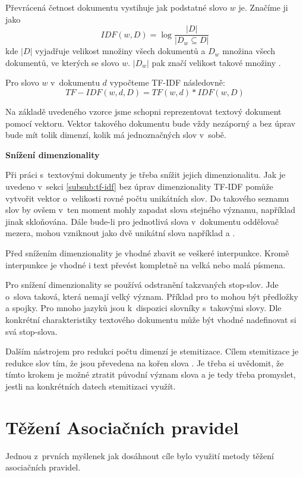 \documentclass[thesis=M,czech]{FITthesis}[2012/10/20]
\begin{document}
\begin{itemize}
			Převrácená četnost dokumentu vystihuje jak podstatné slovo $w$ je. Značíme ji jako $$IDF(w,D) = \log{\frac{|D|}{|D_w \subseteq D|}}$$ kde $|D|$ vyjadřuje velikost množiny všech dokumentů a $D_w$ množina všech dokumentů, ve kterých se slovo $w$. $|D_w|$ pak značí velikost takové množiny \cite{RamosTF-IDF}.
			
			Pro slovo $w$ v~dokumentu $d$ vypočteme TF-IDF následovně:
			$$TF-IDF(w,d,D) = TF(w,d) * IDF(w,D)$$
			
			Na základě uvedeného vzorce jsme schopni reprezentovat textový dokument pomocí vektoru. Vektor takového dokumentu bude vždy nezáporný a bez úprav bude mít tolik dimenzí, kolik má jednoznačných slov v~sobě.
			
		\textbf{Snížení dimenzionality}
		
			Při práci s~textovými dokumenty je třeba snížit jejich dimenzionalitu. Jak je uvedeno v~sekci \ref{subsub:tf-idf} bez úprav dimenzionality TF-IDF pomůže vytvořit vektor o~velikosti rovné počtu unikátních slov. Do takového seznamu slov by ovšem v~ten moment mohly zapadat slova stejného významu, například jinak skloňována. Dále bude-li pro jednotlivá slova v~dokumentu oddělovač mezera, mohou vzniknout jako dvě unikátní slova například  a .
			
			Před snížením dimenzionality je vhodné zbavit se veškeré interpunkce. Kromě interpunkce je vhodné i text převést kompletně na velká nebo malá písmena.
						
			Pro snížení dimenzionality se používá odstranění takzvaných stop-slov. Jde o~slova taková, která nemají velký význam. Příklad pro to mohou být předložky a spojky. Pro mnoho jazyků jsou k~dispozici slovníky s~takovými slovy. Dle konkrétní charakteristiky textového dokumentu může být vhodné nadefinovat si svá stop-slova.
			
			Dalším nástrojem pro redukci počtu dimenzí je stemitizace. Cílem stemitizace je redukce slov tím, že jsou převedena na kořen slova \cite{textPreprop}. Je třeba si uvědomit, že tímto krokem je možné ztratit původní význam slova a je tedy třeba promyslet,  jestli na konkrétních datech stemitizaci využít.		
	\end{itemize}
		
		
	\section{Těžení Asociačních pravidel}
		Jednou z~prvních myšlenek jak dosáhnout cíle bylo využití metody těžení asociačních pravidel. 
		
\end{document}
